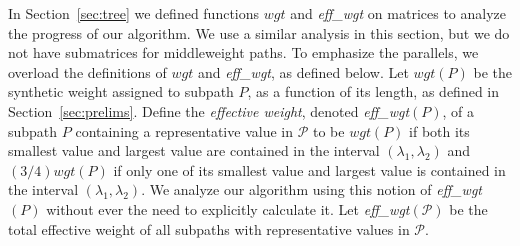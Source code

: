 In Section~\ref{sec:tree} we defined functions $wgt$ and {\it eff\_wgt} on matrices to analyze the progress of our algorithm. 
We use a similar analysis in this section, but we do not have submatrices for middleweight paths. 
To emphasize the parallels, we overload the definitions of $wgt$ and {\it eff\_wgt}, as defined below. 
Let $wgt(P)$ be the synthetic weight assigned to subpath $P$, as a function of its length, as defined in Section~\ref{sec:prelims}. 
Define the {\it effective weight},
denoted {\it eff\_wgt}$(P)$, of a subpath $P$ containing a representative value in $\mathcal{P}$
to be $wgt(P)$ if both its smallest value and largest value
are contained in the interval $(\lambda_1, \lambda_2)$
and $(3/4)wgt(P)$ if only one of its smallest value and largest value
is contained in the interval $(\lambda_1, \lambda_2)$. 
We analyze our algorithm using this notion of {\it eff\_wgt}$(P)$ without ever the need to explicitly calculate it. 
Let {\it eff\_wgt}$(\mathcal{P})$ be the total effective weight of all subpaths with representative values in $\mathcal{P}$.

